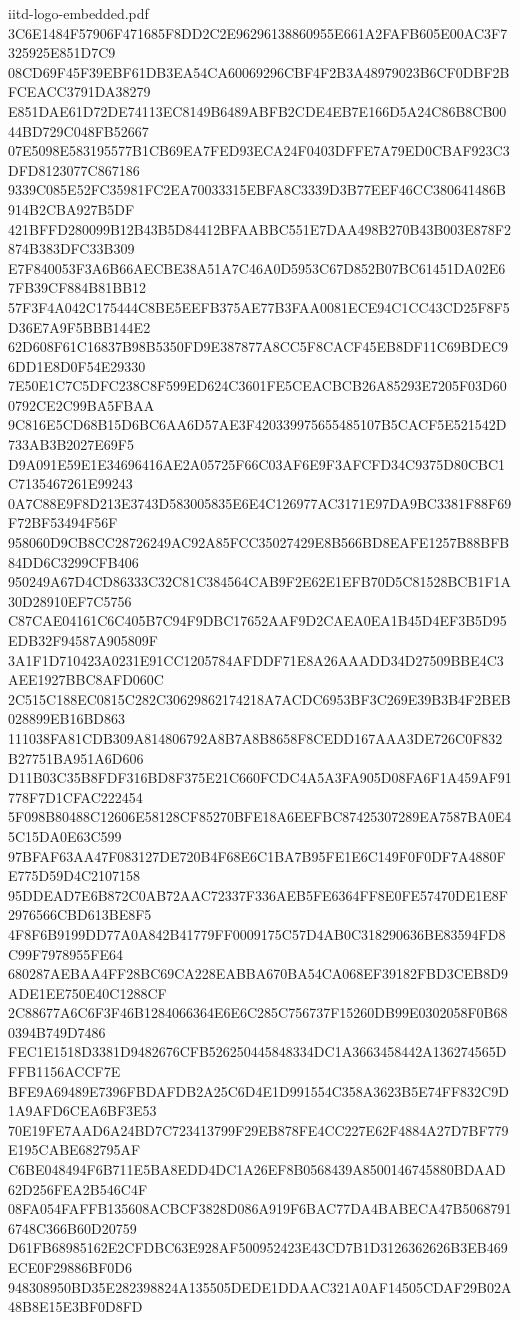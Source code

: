 \begin{filecontents*}[overwrite]{iitd-logo-embedded.pdf}
3C6E1484F57906F471685F8DD2C2E96296138860955E661A2FAFB605E00AC3F7325925E851D7C9
08CD69F45F39EBF61DB3EA54CA60069296CBF4F2B3A48979023B6CF0DBF2BFCEACC3791DA38279
E851DAE61D72DE74113EC8149B6489ABFB2CDE4EB7E166D5A24C86B8CB0044BD729C048FB52667
07E5098E583195577B1CB69EA7FED93ECA24F0403DFFE7A79ED0CBAF923C3DFD8123077C867186
9339C085E52FC35981FC2EA70033315EBFA8C3339D3B77EEF46CC380641486B914B2CBA927B5DF
421BFFD280099B12B43B5D84412BFAABBC551E7DAA498B270B43B003E878F2874B383DFC33B309
E7F840053F3A6B66AECBE38A51A7C46A0D5953C67D852B07BC61451DA02E67FB39CF884B81BB12
57F3F4A042C175444C8BE5EEFB375AE77B3FAA0081ECE94C1CC43CD25F8F5D36E7A9F5BBB144E2
62D608F61C16837B98B5350FD9E387877A8CC5F8CACF45EB8DF11C69BDEC96DD1E8D0F54E29330
7E50E1C7C5DFC238C8F599ED624C3601FE5CEACBCB26A85293E7205F03D600792CE2C99BA5FBAA
9C816E5CD68B15D6BC6AA6D57AE3F420339975655485107B5CACF5E521542D733AB3B2027E69F5
D9A091E59E1E34696416AE2A05725F66C03AF6E9F3AFCFD34C9375D80CBC1C7135467261E99243
0A7C88E9F8D213E3743D583005835E6E4C126977AC3171E97DA9BC3381F88F69F72BF53494F56F
958060D9CB8CC28726249AC92A85FCC35027429E8B566BD8EAFE1257B88BFB84DD6C3299CFB406
950249A67D4CD86333C32C81C384564CAB9F2E62E1EFB70D5C81528BCB1F1A30D28910EF7C5756
C87CAE04161C6C405B7C94F9DBC17652AAF9D2CAEA0EA1B45D4EF3B5D95EDB32F94587A905809F
3A1F1D710423A0231E91CC1205784AFDDF71E8A26AAADD34D27509BBE4C3AEE1927BBC8AFD060C
2C515C188EC0815C282C30629862174218A7ACDC6953BF3C269E39B3B4F2BEB028899EB16BD863
111038FA81CDB309A814806792A8B7A8B8658F8CEDD167AAA3DE726C0F832B27751BA951A6D606
D11B03C35B8FDF316BD8F375E21C660FCDC4A5A3FA905D08FA6F1A459AF91778F7D1CFAC222454
5F098B80488C12606E58128CF85270BFE18A6EEFBC87425307289EA7587BA0E45C15DA0E63C599
97BFAF63AA47F083127DE720B4F68E6C1BA7B95FE1E6C149F0F0DF7A4880FE775D59D4C2107158
95DDEAD7E6B872C0AB72AAC72337F336AEB5FE6364FF8E0FE57470DE1E8F2976566CBD613BE8F5
4F8F6B9199DD77A0A842B41779FF0009175C57D4AB0C318290636BE83594FD8C99F7978955FE64
680287AEBAA4FF28BC69CA228EABBA670BA54CA068EF39182FBD3CEB8D9ADE1EE750E40C1288CF
2C88677A6C6F3F46B1284066364E6E6C285C756737F15260DB99E0302058F0B680394B749D7486
FEC1E1518D3381D9482676CFB526250445848334DC1A3663458442A136274565DFFB1156ACCF7E
BFE9A69489E7396FBDAFDB2A25C6D4E1D991554C358A3623B5E74FF832C9D1A9AFD6CEA6BF3E53
70E19FE7AAD6A24BD7C723413799F29EB878FE4CC227E62F4884A27D7BF779E195CABE682795AF
C6BE048494F6B711E5BA8EDD4DC1A26EF8B0568439A8500146745880BDAAD62D256FEA2B546C4F
08FA054FAFFB135608ACBCF3828D086A919F6BAC77DA4BABECA47B50687916748C366B60D20759
D61FB68985162E2CFDBC63E928AF500952423E43CD7B1D3126362626B3EB469ECE0F29886BF0D6
948308950BD35E282398824A135505DEDE1DDAAC321A0AF14505CDAF29B02A48B8E15E3BF0D8FD

\end{filecontents*}
